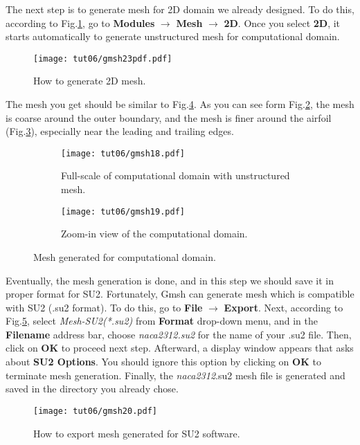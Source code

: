 The next step is to generate mesh for 2D domain we already designed. To do this, according to Fig.\ref{fig6:gmsh23}, go to \textbf{Modules} $\rightarrow$ \textbf{Mesh} $\rightarrow$ \textbf{2D}. Once you select \textbf{2D}, it starts automatically to generate unstructured mesh for computational domain.
\begin{figure}[htbp]
    \centering
    \texttt{[image: tut06/gmsh23pdf.pdf]}
    \caption{How to generate 2D mesh.}
    \label{fig6:gmsh23}
\end{figure}
The mesh you get should be similar to Fig.\ref{fig6:gmsh18}. As you can see form Fig.\ref{fig6:gmsh18 a}, the mesh is coarse around the outer boundary, and the mesh is finer around the airfoil (Fig.\ref{fig6:gmsh18 b}), especially near the leading and trailing edges.
\begin{figure}[htbp]
    \centering
     \begin{subfigure}[b]{.75\textwidth}
         \centering
         \texttt{[image: tut06/gmsh18.pdf]}
         \caption{Full-scale of computational domain with unstructured mesh.}
         \label{fig6:gmsh18 a}
     \end{subfigure}
     \hfill
     \begin{subfigure}[b]{.75\textwidth}
         \centering
         \texttt{[image: tut06/gmsh19.pdf]}
         \caption{Zoom-in view of the computational domain.}
         \label{fig6:gmsh18 b}
     \end{subfigure}  
    \caption{Mesh generated for computational domain.}
    \label{fig6:gmsh18}
\end{figure}
Eventually, the mesh generation is done, and in this step we should save it in proper format for SU2. Fortunately, Gmsh can generate mesh which is compatible with SU2 (.su2 format). To do this, go to \textbf{File} $\rightarrow$ \textbf{Export}. Next, according to Fig.\ref{fig6:gmsh20}, select \textit{Mesh-SU2(*.su2)} from \textbf{Format} drop-down menu, and in the \textbf{Filename} address bar, choose \textit{naca2312.su2} for the name of your .su2 file. Then, click on \textbf{OK} to proceed next step. Afterward, a display window appears that asks about \textbf{SU2 Options}. You should ignore this option by clicking on \textbf{OK} to terminate mesh generation. Finally, the \textit{naca2312}.su2 mesh file is generated and saved in the directory you already chose.
\begin{figure}[htbp]
    \centering
    \texttt{[image: tut06/gmsh20.pdf]}
    \caption{How to export mesh generated for SU2 software.}
    \label{fig6:gmsh20}
\end{figure}
